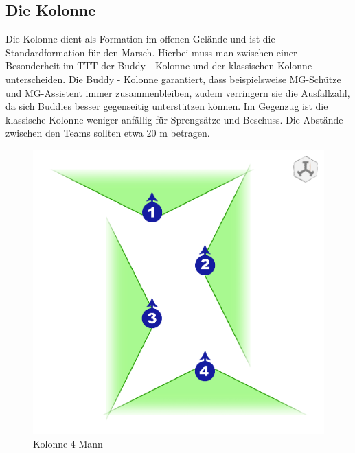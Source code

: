 \subsection{Die Kolonne}
Die Kolonne dient als Formation im offenen Gelände und ist die Standardformation für den Marsch. Hierbei muss man zwischen einer Besonderheit im \ac{TTT} der Buddy - Kolonne und der klassischen Kolonne unterscheiden. Die Buddy - Kolonne garantiert, dass beispielsweise MG-Schütze und MG-Assistent immer zusammenbleiben, zudem verringern sie die Ausfallzahl, da sich Buddies besser gegenseitig unterstützen können. Im Gegenzug ist die klassische Kolonne weniger anfällig für Sprengsätze und Beschuss. Die Abstände zwischen den Teams sollten etwa 20 m betragen.\\
\begin{figure}[htbp]
	\centering
	\includegraphics[width=13cm]{./img/grundlagen/formationen/kolonne_4mann.jpg}
 \caption{Kolonne 4 Mann}
\end{figure}
